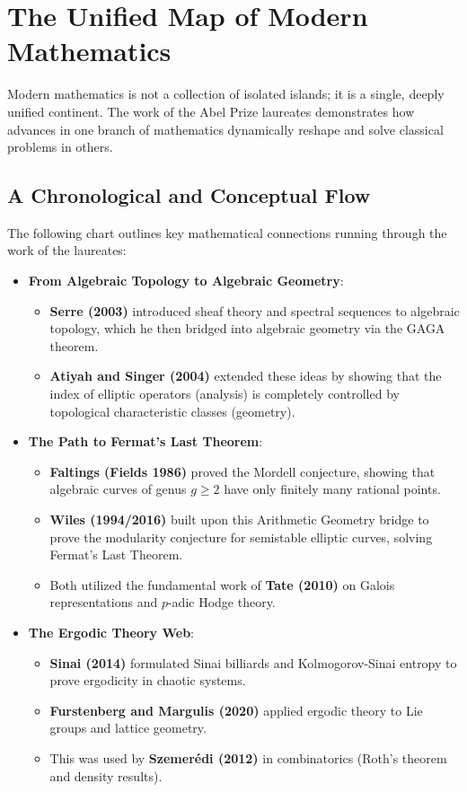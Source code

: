 \chapter{The Unified Map of Modern Mathematics}

Modern mathematics is not a collection of isolated islands; it is a single, deeply unified continent. The work of the Abel Prize laureates demonstrates how advances in one branch of mathematics dynamically reshape and solve classical problems in others.

\section{A Chronological and Conceptual Flow}

The following chart outlines key mathematical connections running through the work of the laureates:

\begin{itemize}
    \item \textbf{From Algebraic Topology to Algebraic Geometry}: 
    \begin{itemize}
        \item \textbf{Serre (2003)} introduced sheaf theory and spectral sequences to algebraic topology, which he then bridged into algebraic geometry via the GAGA theorem.
        \item \textbf{Atiyah and Singer (2004)} extended these ideas by showing that the index of elliptic operators (analysis) is completely controlled by topological characteristic classes (geometry).
    \end{itemize}
    
    \item \textbf{The Path to Fermat's Last Theorem}:
    \begin{itemize}
        \item \textbf{Faltings (Fields 1986)} proved the Mordell conjecture, showing that algebraic curves of genus $g \geq 2$ have only finitely many rational points.
        \item \textbf{Wiles (1994/2016)} built upon this Arithmetic Geometry bridge to prove the modularity conjecture for semistable elliptic curves, solving Fermat's Last Theorem.
        \item Both utilized the fundamental work of \textbf{Tate (2010)} on Galois representations and $p$-adic Hodge theory.
    \end{itemize}
    
    \item \textbf{The Ergodic Theory Web}:
    \begin{itemize}
        \item \textbf{Sinai (2014)} formulated Sinai billiards and Kolmogorov-Sinai entropy to prove ergodicity in chaotic systems.
        \item \textbf{Furstenberg and Margulis (2020)} applied ergodic theory to Lie groups and lattice geometry.
        \item This was used by \textbf{Szemer\'edi (2012)} in combinatorics (Roth's theorem and density results).
    \end{itemize}
\end{itemize}

